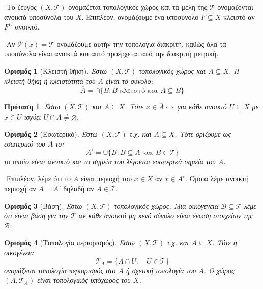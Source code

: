 \documentclass[oneside,a4paper]{article}
\newtheorem*{defn}{Ορισμός}
\newtheorem{prop}{Πρόταση}
\begin{document}
$ $\newline
\noindent Το ζεύγος $(X,\mathcal T)$ ονομάζεται τοπολογικός χώρος και τα μέλη της $\mathcal T$ ονομάζονται ανοικτά υποσύνολα του $X$. Επιπλέον, ονομάζουμε ένα υποσύνολο $F\subseteq X$ κλειστό αν $F^C$ ανοικτό.

$ $\newline
\noindent Αν $\mathcal P (x) = \mathcal T$ ονομάζουμε αυτήν την τοπολογία διακριτή, καθώς όλα τα υποσύνολα είναι ανοικτά και αυτό προέρχεται από την διακριτή μετρική.


\begin{defn}[Κλειστή θήκη]
	Έστω $(X,\mathcal T)$ τοπολογικός χώρος και $A \subseteq X$. Η κλειστή θήκη ή κλειστότητα του $A$ είναι το σύνολο:
	$$\overline{A} = \cap \{B: B \text{ κλειστό και } A\subseteq B\}$$
\end{defn}
\vspace{0.1cm}
\begin{prop}
	Έστω $(X,\mathcal T)$ και $A \subseteq X$. Τότε $x\in \overline A \iff$ για κάθε ανοικτό $U \subseteq X$ με $x \in U$ ισχύει $U\cap A \neq \varnothing$.
\end{prop}

\vspace{0.1cm}

\begin{defn}[Εσωτερικό]
	Έστω $(X,\mathcal T)$ τ.χ. και $A \subseteq X$. Τότε ορίζουμε ως εσωτερικό του $A$ το:
	$$A^{\circ} = \cup \{B: B\subseteq A \text{ και } B \in \mathcal T\}$$
	το οποίο είναι ανοικτό και τα σημεία του λέγονται εσωτερικά σημεία του $A$.
\end{defn}

$ $\newline
\noindent Επιπλέον, λέμε ότι το $A$ είναι περιοχή του $x \in X$ αν $x \in A^{\circ}$. Όμοια λέμε ανοικτή περιοχή αν $A=A^{\circ}$ δηλαδή αν $A \in \mathcal T$.

\begin{defn}[Βάση]
	Έστω $(X,\mathcal T)$ τοπολογικός χώρος. Μια οικογένεια $\mathcal B \subseteq \mathcal T$ λέμε ότι έιναι βάση για την $\mathcal T$ αν κάθε ανοικτό μη κενό σύνολο είναι ένωση στοιχείων της $\mathcal B$.
\end{defn}

\vspace{0.1cm}

\begin{defn}[Τοπολογία περιορισμός]
	Έστω $(X,\mathcal T)$ τ.χ. και $A \subseteq X$. Τότε η οικογένεια
	$$\mathcal{T}_A = \{A\cap U: \quad U \in \mathcal{T} \}$$
	ονομάζεται τοπολογία περιορισμός στο $A$ ή σχετική τοπολογία του $A$. Ο χώρος $(A, \mathcal T_A)$ είναι τοπολογικός υπόχωρος του $X$.
\end{defn}
\end{document}
